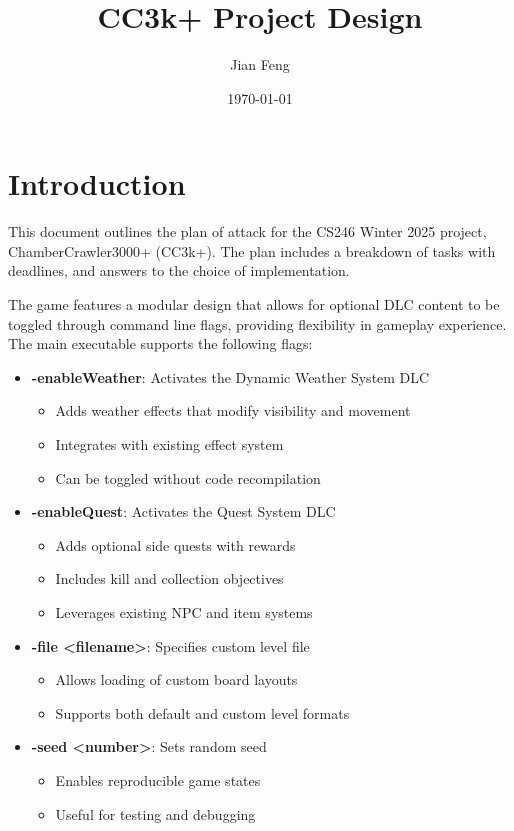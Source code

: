 \documentclass{article}
\title{CC3k+ Project Design}
\author{Jian Feng}
\date{\today}
\begin{document}
\maketitle

\section{Introduction}
This document outlines the plan of attack for the CS246 Winter 2025 project, ChamberCrawler3000+ (CC3k+). The plan includes a breakdown of tasks with deadlines, and answers to the choice of implementation.

The game features a modular design that allows for optional DLC content to be toggled through command line flags, providing flexibility in gameplay experience. The main executable supports the following flags:

\begin{itemize}
    \item \textbf{-enableWeather}: Activates the Dynamic Weather System DLC
    \begin{itemize}
        \item Adds weather effects that modify visibility and movement
        \item Integrates with existing effect system
        \item Can be toggled without code recompilation
    \end{itemize}
    
    \item \textbf{-enableQuest}: Activates the Quest System DLC
    \begin{itemize}
        \item Adds optional side quests with rewards
        \item Includes kill and collection objectives
        \item Leverages existing NPC and item systems
    \end{itemize}
    
    \item \textbf{-file <filename>}: Specifies custom level file
    \begin{itemize}
        \item Allows loading of custom board layouts
        \item Supports both default and custom level formats
    \end{itemize}
    
    \item \textbf{-seed <number>}: Sets random seed
    \begin{itemize}
        \item Enables reproducible game states
        \item Useful for testing and debugging
    \end{itemize}
\end{itemize}
\end{document}
